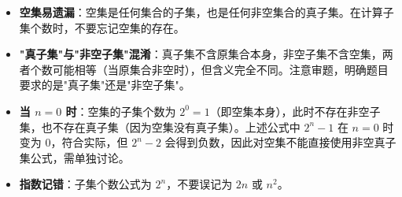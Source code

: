 \begin{trapbox}
\begin{itemize}
    \item \textbf{空集易遗漏}：空集是任何集合的子集，也是任何非空集合的真子集。在计算子集个数时，不要忘记空集的存在。
    \item \textbf{"真子集"与"非空子集"混淆}：真子集不含原集合本身，非空子集不含空集，两者个数可能相等（当原集合非空时），但含义完全不同。注意审题，明确题目要求的是"真子集"还是"非空子集"。
    \item \textbf{当 $n=0$ 时}：空集的子集个数为 $2^0=1$（即空集本身），此时不存在非空子集，也不存在真子集（因为空集没有真子集）。上述公式中 $2^n-1$ 在 $n=0$ 时变为 $0$，符合实际，但 $2^n-2$ 会得到负数，因此对空集不能直接使用非空真子集公式，需单独讨论。
    \item \textbf{指数记错}：子集个数公式为 $2^n$，不要误记为 $2n$ 或 $n^2$。
\end{itemize}
\end{trapbox}
